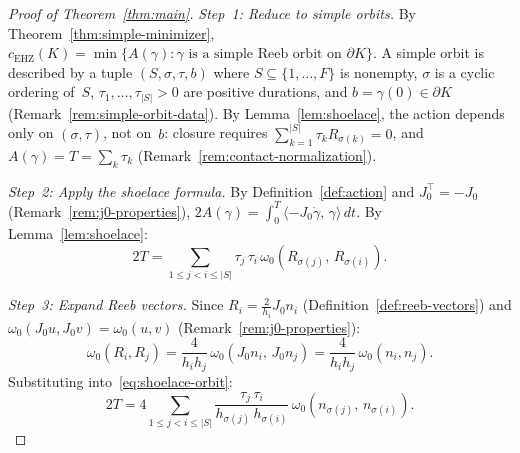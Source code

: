 \begin{proof}[Proof of Theorem~\ref{thm:main}]

\emph{Step~1: Reduce to simple orbits.}
By Theorem~\ref{thm:simple-minimizer},
$c_{\mathrm{EHZ}}(K) = \min\{ A(\gamma) :
\gamma \text{ is a simple Reeb orbit on } \partial K \}$.
A simple orbit is described by a tuple
$(S, \sigma, \tau, b)$ where $S \subseteq \{1, \ldots, F\}$ is
nonempty, $\sigma$ is a cyclic ordering of~$S$,
$\tau_1, \ldots, \tau_{|S|} > 0$ are positive durations, and
$b = \gamma(0) \in \partial K$
(Remark~\ref{rem:simple-orbit-data}).
By Lemma~\ref{lem:shoelace}, the action depends only on
$(\sigma, \tau)$, not on~$b$: closure requires
$\sum_{k=1}^{|S|} \tau_k R_{\sigma(k)} = 0$, and
$A(\gamma) = T = \sum_k \tau_k$
(Remark~\ref{rem:contact-normalization}).

\emph{Step~2: Apply the shoelace formula.}
By Definition~\ref{def:action} and $J_0^\top = -J_0$
(Remark~\ref{rem:j0-properties}),
$2A(\gamma) = \int_0^T \langle -J_0 \dot{\gamma},\,
\gamma \rangle\, dt$.
By Lemma~\ref{lem:shoelace}:
\begin{equation}\label{eq:shoelace-orbit}
  2T = \sum_{1 \leq j < i \leq |S|}
    \tau_j\, \tau_i\,
    \omega_0(R_{\sigma(j)},\, R_{\sigma(i)}).
\end{equation}

\emph{Step~3: Expand Reeb vectors.}
Since $R_i = \frac{2}{h_i} J_0 n_i$
(Definition~\ref{def:reeb-vectors}) and
$\omega_0(J_0 u, J_0 v) = \omega_0(u, v)$
(Remark~\ref{rem:j0-properties}):
\[
  \omega_0(R_i, R_j)
  = \frac{4}{h_i h_j}\, \omega_0(J_0 n_i,\, J_0 n_j)
  = \frac{4}{h_i h_j}\, \omega_0(n_i, n_j).
\]
Substituting into~\eqref{eq:shoelace-orbit}:
\begin{equation}\label{eq:shoelace-normals}
  2T = 4 \sum_{1 \leq j < i \leq |S|}
    \frac{\tau_j\, \tau_i}
         {h_{\sigma(j)}\, h_{\sigma(i)}}\,
    \omega_0(n_{\sigma(j)},\, n_{\sigma(i)}).
\end{equation}


\end{proof}
